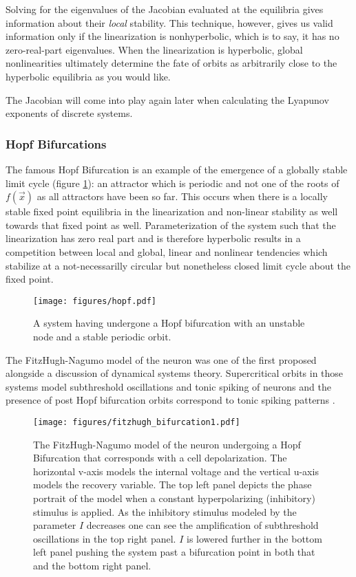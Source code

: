 \documentclass{elsart}
\begin{document}
Solving for the eigenvalues of the Jacobian evaluated at the equilibria gives
information about their \textit{local} stability.  This technique,
however, gives us valid information only if the linearization is nonhyperbolic,
    which is to say, it has no zero-real-part eigenvalues.  When the
    linearization is hyperbolic, global nonlinearities ultimately determine
    the fate of orbits as arbitrarily close to the hyperbolic equilibria as you
    would like.

The Jacobian will come into play again later when calculating the Lyapunov
exponents of discrete systems.

\subsubsection{ Hopf Bifurcations }
The famous Hopf Bifurcation is an example of the emergence of a globally
stable limit cycle (figure \ref{fig:hopf}): an attractor which is periodic and not one of the
roots of $f(\vec{x})$ as all attractors have been so far.  This occurs when
there is a locally stable fixed point equilibria in the linearization and 
non-linear stability as well towards that fixed point as well.  
Parameterization of 
the system such that the linearization has zero real part and is 
therefore hyperbolic results in a 
competition between local and global, linear and nonlinear tendencies which 
stabilize at a not-necessarilly circular but nonetheless closed limit cycle 
about the fixed point.

\begin{figure}[htp]
\centering
\texttt{[image: figures/hopf.pdf]}
\caption{A system having undergone a Hopf bifurcation with an unstable node
and a stable periodic orbit.} 
\label{fig:hopf}
\end{figure}


The FitzHugh-Nagumo model of the neuron was one of the first proposed
alongside a discussion of dynamical systems theory.  Supercritical orbits in those systems model 
subthreshold oscillations and tonic spiking of neurons and the presence of
post Hopf bifurcation orbits correspond to tonic spiking patterns \cite{fitzhugh, izhikevich_book}.

\begin{figure}[htp]
\centering
\texttt{[image: figures/fitzhugh\_bifurcation1.pdf]}
\caption{The FitzHugh-Nagumo model of the neuron 
undergoing a Hopf Bifurcation that
corresponds with a cell depolarization.  The horizontal v-axis models the
internal voltage and the vertical u-axis models the recovery variable.
The top left panel depicts the phase
portrait of the model when a constant hyperpolarizing (inhibitory) stimulus is applied.  As the inhibitory stimulus modeled by the parameter $I$ decreases
one can see the amplification of subthreshold oscillations in the top right
panel.  $I$ is lowered further in the bottom left panel pushing the system past
a bifurcation point in both that and the bottom right panel.}
\label{fig:fhn1}
\end{figure}
\end{document}
